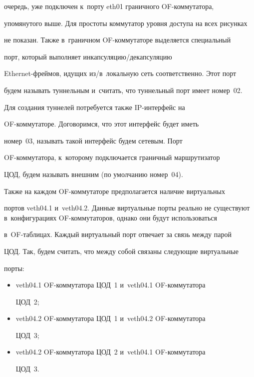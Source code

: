 очередь, уже подключен к~порту eth01 граничного OF-ком\-му\-та\-то\-ра, 


упомянутого выше. Для простоты коммутатор уровня доступа на всех рисунках 


не показан. Также в~граничном OF-ком\-му\-та\-то\-ре выделяется специальный 


порт, который выполняет ин\-кап\-су\-ля\-цию\!/\!де\-кап\-су\-ля\-цию  


Ethernet-фрей\-мов, идущих из\!/\!в~локальную сеть соответственно. Этот порт 


будем называть туннельным и~считать, что туннельный порт имеет номер~02. 


Для создания туннелей потребуется также IP-ин\-тер\-фейс на  


OF-ком\-му\-та\-то\-ре. Договоримся, что этот интерфейс будет иметь 


номер~03, называть такой интерфейс будем сетевым. Порт 


 OF-ком\-му\-та\-то\-ра, к~которому подключается граничный маршрутизатор 


ЦОД, будем называть внешним (по умолчанию номер~04).


  


  Также на каждом OF-коммутаторе предполагается наличие виртуальных 


портов veth04.1 и~veth04.2. Данные виртуальные порты реально не существуют в~конфигурациях OF-коммутаторов, однако они будут использоваться  


в~OF-таб\-ли\-цах. Каждый виртуальный порт отвечает за связь между парой 


ЦОД. Так, будем считать, что между собой связаны следующие виртуальные 


порты:


  \begin{itemize}


\item veth04.1 OF-коммутатора ЦОД~1 и~veth04.1 OF-ком\-му\-та\-то\-ра 


ЦОД~2;\\[-10pt]


\item veth04.2 OF-коммутатора ЦОД~1 и~veth04.2 OF-ком\-му\-та\-то\-ра 


ЦОД~3;\\[-10pt]


\item veth04.2 OF-коммутатора ЦОД~2 и~veth04.1 OF-ком\-му\-та\-то\-ра 


ЦОД~3.


\end{itemize}





